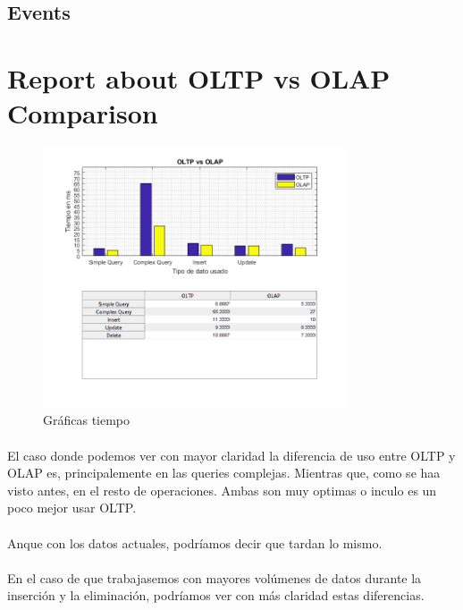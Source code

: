 \documentclass[a4paper 
,twoside
]{article}
\begin{document}
  \subsection{Events}
\pagebreak
\section{Report about OLTP vs OLAP Comparison}
  \begin{figure}[H]
    \centering
    \includegraphics[width=0.8\textwidth]{graficas.png}
    \caption{Gráficas tiempo}
    \label{fig:specular}
  \end{figure}

\paragraph{}
El caso donde podemos ver con mayor claridad la diferencia de uso entre OLTP y OLAP es, principalemente en las queries complejas. Mientras que, como se haa visto antes, en el resto de operaciones. Ambas son muy optimas o inculo es un poco mejor usar OLTP.

\paragraph{}
Anque con los datos actuales, podríamos decir que tardan lo mismo.

\paragraph{}
En el caso de que trabajasemos con mayores volúmenes de datos durante la inserción y la eliminación, podríamos ver con más claridad estas diferencias.
\end{document}
